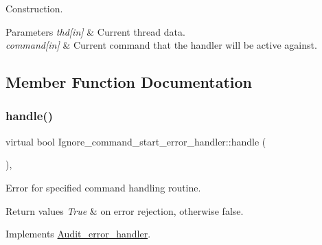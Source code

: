 Construction. 


\begin{DoxyParams}{Parameters}
{\em thd\mbox{[}in\mbox{]}} & Current thread data. \\
\hline
{\em command\mbox{[}in\mbox{]}} & Current command that the handler will be active against. \\
\hline
\end{DoxyParams}


\subsection{Member Function Documentation}
\mbox{\label{classIgnore__command__start__error__handler_a237add9c946d5b5f76c40483bde4a4b7}} 
\subsubsection{\texorpdfstring{handle()}{handle()}}
{\footnotesize\ttfamily virtual bool Ignore\+\_\+command\+\_\+start\+\_\+error\+\_\+handler\+::handle (\begin{DoxyParamCaption}{ }\end{DoxyParamCaption})\hspace{0.3cm}{\ttfamily [inline]}, {\ttfamily [virtual]}}



Error for specified command handling routine. 


\begin{DoxyRetVals}{Return values}
{\em True} & on error rejection, otherwise false. \\
\hline
\end{DoxyRetVals}


Implements \mbox{\hyperlink{classAudit__error__handler_aa674ae49782d768001e7bd1d11f16c68}{Audit\+\_\+error\+\_\+handler}}.

\mbox{\label{classIgnore__command__start__error__handler_afa03128280356fc46b16d9bb7c0a0aad}} 
